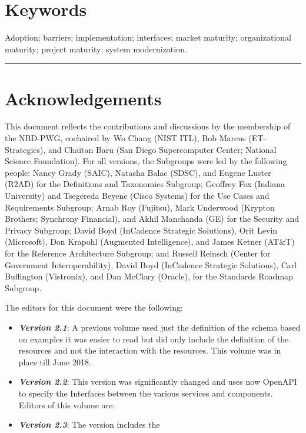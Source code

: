\documentclass[9pt,]{article}
\begin{document}
\hypertarget{keywords}{%
\section{Keywords}\label{keywords}}

Adoption; barriers; implementation; interfaces; market maturity;
organizational maturity; project maturity; system modernization.

\begin{center}\rule{0.5\linewidth}{\linethickness}\end{center}

\hypertarget{acknowledgements}{%
\section{Acknowledgements}\label{acknowledgements}}

This document reflects the contributions and discussions by the
membership of the NBD-PWG, cochaired by Wo Chang (NIST ITL), Bob Marcus
(ET-Strategies), and Chaitan Baru (San Diego Supercomputer Center;
National Science Foundation). For all versions, the Subgroups were led
by the following people: Nancy Grady (SAIC), Natasha Balac (SDSC), and
Eugene Luster (R2AD) for the Definitions and Taxonomies Subgroup;
Geoffrey Fox (Indiana University) and Tsegereda Beyene (Cisco Systems)
for the Use Cases and Requirements Subgroup; Arnab Roy (Fujitsu), Mark
Underwood (Krypton Brothers; Synchrony Financial), and Akhil Manchanda
(GE) for the Security and Privacy Subgroup; David Boyd (InCadence
Strategic Solutions), Orit Levin (Microsoft), Don Krapohl (Augmented
Intelligence), and James Ketner (AT\&T) for the Reference Architecture
Subgroup; and Russell Reinsch (Center for Government Interoperability),
David Boyd (InCadence Strategic Solutions), Carl Buffington (Vistronix),
and Dan McClary (Oracle), for the Standards Roadmap Subgroup.

The editors for this document were the following:

\begin{itemize}
\item
  \textbf{\emph{Version 2.1}}: A previous volume used just the
  definition of the schema based on examples it was easier to read but
  did only include the definition of the resources and not the
  interaction with the resources. This volume was in place till June
  2018.
\item
  \textbf{\emph{Version 2.2}}: This version was significantly changed
  and uses now OpenAPI to specify the Interfaces between the various
  services and components. Editors of this volume are:
\item
  \textbf{\emph{Version 2.3}}: The version includes the
\end{itemize}
\end{document}
